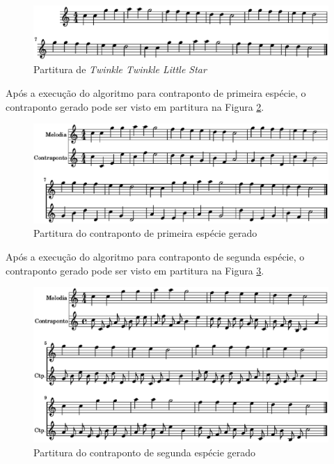     \begin{figure}[htb]
      \centering
      \includegraphics[scale=0.6]{figuras/twinkleoriginal.eps}
      \caption{Partitura de \textit{Twinkle Twinkle Little Star}}
      \label{twinkleoriginal}
    \end{figure}

    Após a execução do algoritmo para contraponto de primeira espécie, o contraponto gerado pode ser visto em partitura na Figura \ref{cont1.2}.

    \begin{figure}[htb]
      \centering
      \includegraphics[scale=0.6]{figuras/cont1.2.eps}
      \caption{Partitura do contraponto de primeira espécie gerado}
      \label{cont1.2}
    \end{figure}

    Após a execução do algoritmo para contraponto de segunda espécie, o contraponto gerado pode ser visto em partitura na Figura \ref{cont2.2}.

        \begin{figure}[htb]
          \centering
          \includegraphics[scale=0.6]{figuras/cont2.2.eps}
          \caption{Partitura do contraponto de segunda espécie gerado}
          \label{cont2.2}
        \end{figure}

